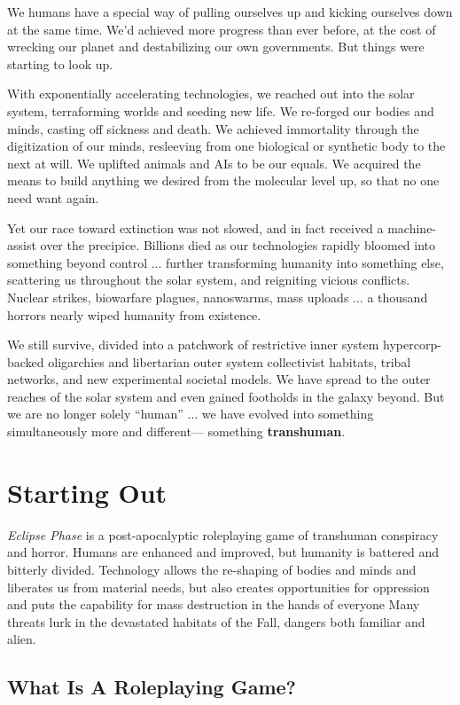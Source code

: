 We humans have a special way of pulling ourselves up 
and kicking ourselves down at the same time. We'd 
achieved more progress than ever before, at the cost 
of wrecking our planet and destabilizing our own 
governments. But things were starting to look up.

With exponentially accelerating technologies, we 
reached out into the solar system, terraforming worlds 
and seeding new life. We re-forged our bodies and 
minds, casting off sickness and death. We achieved 
immortality through the digitization of our minds, 
resleeving from one biological or synthetic body to 
the next at will. We uplifted animals and AIs to be our 
equals. We acquired the means to build anything we 
desired from the molecular level up, so that no one 
need want again.

Yet our race toward extinction was not slowed, and 
in fact received a machine-assist over the precipice. 
Billions died as our technologies rapidly bloomed into 
something beyond control ... further transforming 
humanity into something else, scattering us throughout
the solar system, and reigniting vicious conflicts.
Nuclear strikes, biowarfare plagues, nanoswarms, 
mass uploads ... a thousand horrors nearly wiped 
humanity from existence.

We still survive, divided into a patchwork of restrictive
inner system hypercorp-backed oligarchies and
libertarian outer system collectivist habitats, tribal 
networks, and new experimental societal models. We 
have spread to the outer reaches of the solar system 
and even gained footholds in the galaxy beyond. But 
we are no longer solely ``human'' ... we have evolved 
into something simultaneously more and different—
something \textbf{transhuman}.

\section{Starting Out}

\textit{Eclipse Phase} is a post-apocalyptic roleplaying game 
of transhuman conspiracy and horror. Humans are 
enhanced and improved, but humanity is battered and 
bitterly divided. Technology allows the re-shaping of 
bodies and minds and liberates us from material needs, 
but also creates opportunities for oppression and puts 
the capability for mass destruction in the hands of everyone
Many threats lurk in the devastated habitats of
the Fall, dangers both familiar and alien.

\subsection{What Is A Roleplaying Game?}

